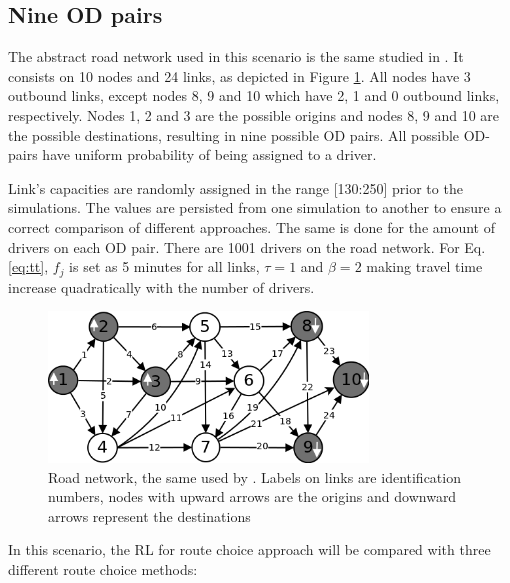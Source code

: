 \documentclass{RITA}
\newcommand{\fftt}{\ensuremath{f_j}} 		%
\begin{document}
\subsection{Nine OD pairs}
\label{sec:nineODDescription}
The abstract road network used in this scenario is the same studied in \cite{Galib&Moser2011}. It consists on 10 nodes and 24 links, as depicted in Figure \ref{fig:roadnetwork}. All nodes have 3 outbound links, except nodes 8, 9 and 10 which have 2, 1 and 0 outbound links, respectively. Nodes 1, 2 and 3 are the possible origins and nodes 8, 9 and 10 are the possible destinations, resulting in nine possible OD pairs. All possible OD-pairs have uniform probability of being assigned to a driver.

Link's capacities are randomly assigned in the range [130:250] prior to the simulations. The values are persisted from one simulation to another to ensure a correct comparison of different approaches. The same is done for the amount of drivers on each OD pair. There are 1001 drivers on the road network. For Eq. \eqref{eq:tt}, $\fftt$ is set as 5 minutes for all links, $\tau = 1$ and $\beta = 2$ making travel time increase quadratically with the number of drivers.

\begin{figure}[ht]
    \centerline{\includegraphics[width=8.5cm]{img/roadnetwork.png}}
    \caption{Road network, the same used by \cite{Galib&Moser2011}. Labels on links are identification numbers, nodes with upward arrows are the origins and downward arrows represent the destinations}
    \label{fig:roadnetwork}
\end{figure}

In this scenario, the RL for route choice approach will be compared with three different route choice methods:
\end{document}
